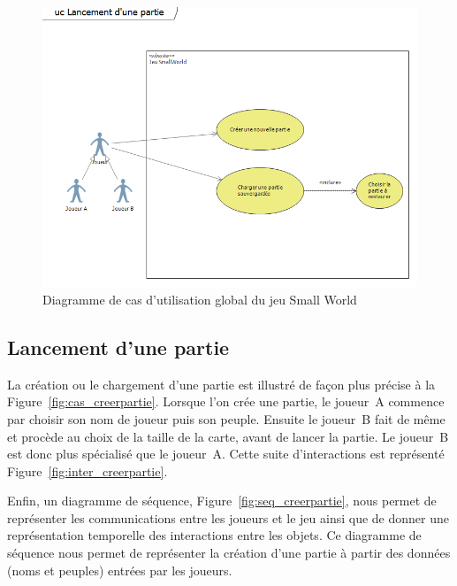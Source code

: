 \documentclass[a4paper]{article}%
\begin{document}
\begin{figure}[H]
    \centering
    \includegraphics[width=\textwidth]{./images/cas_dutilisation/jeuglobal.png}
		\caption{Diagramme de cas d'utilisation global du jeu Small World}
		\label{fig:jeuglobal}
\end{figure}

\subsection{Lancement d'une partie}

La création ou le chargement d'une partie est illustré de façon plus précise à la Figure~\ref{fig:cas_creerpartie}.
Lorsque l'on crée une partie, le joueur~A commence par choisir son nom de joueur puis son peuple. Ensuite le joueur~B fait de même et procède au choix de la taille de la carte, avant de lancer la partie. Le joueur~B est donc plus spécialisé que le joueur~A. Cette suite d'interactions est représenté Figure~\ref{fig:inter_creerpartie}.

Enfin, un diagramme de séquence, Figure~\ref{fig:seq_creerpartie}, nous permet de représenter les communications entre les joueurs et le jeu ainsi que de donner une représentation temporelle des interactions entre les objets. Ce diagramme de séquence nous permet de représenter la création d'une partie à partir des données (noms et peuples) entrées par les joueurs.
\end{document}
